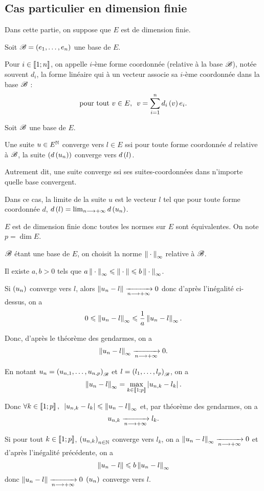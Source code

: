 \subsection{Cas particulier en dimension finie}

Dans cette partie, on suppose que \(E\) est de dimension finie.

\begin{defi}
Soit \(\mathscr{B}=\left(e_1,\dots,e_n\right)\) une base de \(E\).

Pour \(i\in\left\llbracket1;n\right\rrbracket\), on appelle \(i\)-ème forme coordonnée (relative à la base \(\mathscr{B}\)), notée souvent \(d_i\), la forme linéaire qui à un vecteur associe sa \(i\)-ème coordonnée dans la base \(\mathscr{B}\) : \[\quantifs{\tpt v\in E}v=\sum_{i=1}^nd_i\paren{v}e_i.\]
\end{defi}

\begin{theo}
Soit \(\mathscr{B}\) une base de \(E\).

Une suite \(u\in E^{\mathbb{N}}\) converge vers \(l\in E\) ssi pour toute forme coordonnée \(d\) relative à \(\mathscr{B}\), la suite \(\left(d\left(u_n\right)\right)\) converge vers \(d\left(l\right)\).

Autrement dit, une suite converge ssi ses suites-coordonnées dans n'importe quelle base convergent.

Dans ce cas, la limite de la suite \(u\) est le vecteur \(l\) tel que pour toute forme coordonnée \(d\), \(d\left(l\right)=\lim_{n\longrightarrow+\infty}d\left(u_n\right)\).
\end{theo}

\begin{dem}
\(E\) est de dimension finie donc toutes les normes sur \(E\) sont équivalentes. On note \(p=\dim E\).

\(\mathscr{B}\) étant une base de \(E\), on choisit la norme \(\norme{}_\infty\) relative à \(\mathscr{B}\).

Il existe \(a,b>0\) tels que \(a\norme{}_\infty\leq\norme{}\leq b\norme{}_\infty\).

\impdir

Si \(\left(u_n\right)\) converge vers \(l\), alors \(\norme{u_n-l}\tendqd{n\to\pinf}0\) donc d'après l'inégalité ci-dessus, on a \[0\leq\norme{u_n-l}_\infty\leq\dfrac{1}{a}\norme{u_n-l}_\infty.\]

Donc, d'après le théorème des gendarmes, on a \[\norme{u_n-l}_\infty\tendqd{n\to\pinf}0.\]

En notant \(u_n=\left(u_{n,1},\dots,u_{n,p}\right)_{\mathscr{B}}\) et \(l=\left(l_1,\dots,l_p\right)_{\mathscr{B}}\), on a \[\norme{u_n-l}_\infty=\max_{k\in\interventierii{1}{p}}\abs{u_{n,k}-l_k}.\]

Donc \(\quantifs{\forall k\in\interventierii{1}{p}}\abs{u_{n,k}-l_k}\leq\norme{u_n-l}_\infty\) et, par théorème des gendarmes, on a \[u_{n,k}\xrightarrow[n\longrightarrow+\infty]{}l_k.\]

\imprec

Si pour tout \(k\in\left\llbracket1;p\right\rrbracket\), \(\left(u_{n,k}\right)_{n\in\mathbb{N}}\) converge vers \(l_k\), on a \(\norme{u_n-l}_\infty\tendqd{n\to\pinf}0\) et d'après l'inégalité précédente, on a \[\norme{u_n-l}\leq b\norme{u_n-l}_\infty\] donc \(\norme{u_n-l}\tendqd{n\to\pinf}0\) \ie \(\left(u_n\right)\) converge vers \(l\).
\end{dem}

